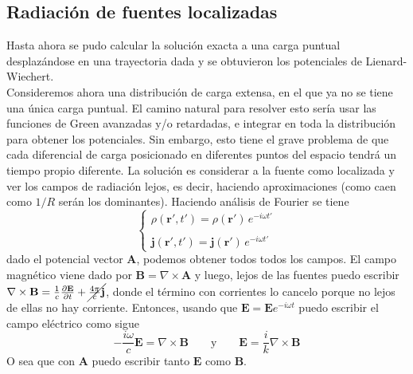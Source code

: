 


\subsection{Radiación de fuentes localizadas}
Hasta ahora se pudo calcular la solución exacta a una carga puntual desplazándose en una trayectoria dada y se obtuvieron los potenciales de Lienard-Wiechert.\\
\indent Consideremos ahora una distribución de carga extensa, en el que ya no se tiene una única carga puntual. El camino natural para resolver esto sería usar las funciones de Green avanzadas y/o retardadas, e integrar en toda la distribución para obtener los potenciales. Sin embargo, esto tiene el grave problema de que cada diferencial de carga posicionado en diferentes puntos del espacio tendrá un tiempo propio diferente. La solución es considerar a la fuente como localizada y ver los campos de radiación lejos, es decir, haciendo aproximaciones (como caen como $1/R$ serán los dominantes). Haciendo análisis de Fourier se tiene
\begin{equation*}
    \left\{
        \begin{matrix}
            \rho(\textbf{r}', t') = \rho(\textbf{r}')\,e^{-i\omega t'}\\
            \\
            \textbf{j}(\textbf{r}', t') = \textbf{j}(\textbf{r}')\,e^{-i\omega t'}
        \end{matrix}
    \right.
\end{equation*}
dado el potencial vector $\textbf{A}$, podemos obtener todos todos los campos. El campo magnético viene dado por $\textbf{B} = \nabla \times \textbf{A}$ y luego, lejos de las fuentes puedo escribir $\nabla \times \textbf{B} = \frac{1}{c}\frac{\partial \textbf{E}}{\partial t} + \cancel{\frac{4\pi}{c}\textbf{j}}$, donde el término con corrientes lo cancelo porque no lejos de ellas no hay corriente. Entonces, usando que $\textbf{E} = \textbf{E}e^{-i\omega t}$ puedo escribir el campo eléctrico como sigue
\begin{equation*}
    -\frac{i\omega}{c}\textbf{E} = \nabla \times \textbf{B}
    \quad
    \quad
    \mbox{y}
    \quad
    \quad
    \textbf{E} = \frac{i}{k}\nabla \times \textbf{B}
\end{equation*}
O sea que con $\textbf{A}$ puedo escribir tanto $\textbf{E}$ como $\textbf{B}$.\\
